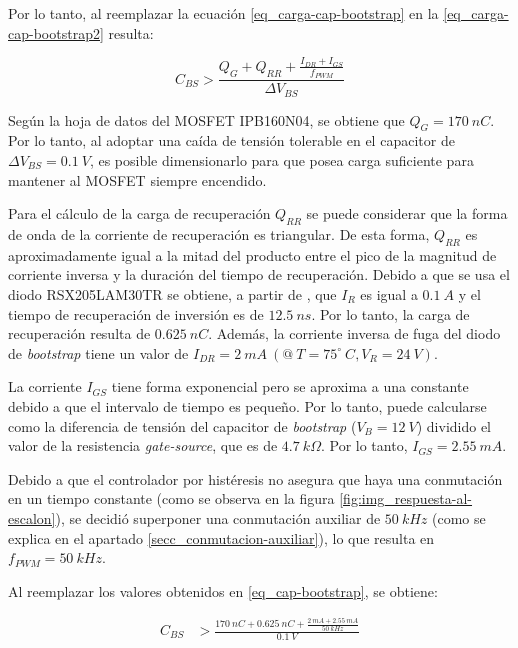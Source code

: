 \noindent Por lo tanto, al reemplazar la ecuación \ref{eq_carga-cap-bootstrap} en la \ref{eq_carga-cap-bootstrap2} resulta:


\begin{equation} \label{eq_cap-bootstrap}
	C_{BS} > \frac{Q_G+Q_{RR} + \frac{I_{DR}+I_{GS}}{f_{PWM}}}{\Delta V_{BS}}
\end{equation}

\noindent Según la hoja de datos \cite{IPB160N04} del MOSFET IPB160N04, se obtiene que $Q_G= 170\:nC$. Por lo tanto, al adoptar una caída de tensión tolerable en el capacitor de $\Delta V_{BS} = 0.1\:V$, es posible dimensionarlo para que posea carga suficiente para mantener al MOSFET siempre encendido.

\noindent Para el cálculo de la carga de recuperación $Q_{RR}$ se puede considerar que la forma de onda de la corriente de recuperación es triangular. De esta forma,  $Q_{RR}$ es aproximadamente igual a la mitad del producto entre el pico de la magnitud de corriente inversa y la duración del tiempo de recuperación.  Debido a que se usa el diodo RSX205LAM30TR se obtiene, a partir de \cite{RSX205LAM30}, que  $I_R$ es igual a $0.1\:A$  y  el tiempo de recuperación de inversión es de $12.5\:ns$. Por lo tanto, la carga de recuperación resulta de $0.625\:nC$. Además, la corriente inversa de fuga del diodo de \textsl{bootstrap} tiene un valor de $I_{DR} =2 \:mA\:(@\: T=75^{\circ}\:C, V_R= 24\:V)$.

\noindent La corriente $I_{GS}$ tiene forma exponencial pero se aproxima a una constante debido a que el intervalo de tiempo es pequeño. Por lo tanto, puede calcularse como la diferencia de tensión del capacitor de \textsl{bootstrap} ($V_B=12\:V$) dividido el valor de la resistencia \textsl{gate-source}, que es de $4.7\:k\Omega$. Por lo tanto, $I_{GS}=2.55 \:mA$. 

\noindent Debido a que el controlador por histéresis no asegura que haya una conmutación en un tiempo constante (como se observa en la figura \ref{fig:img_respuesta-al-escalon}), se decidió superponer una conmutación auxiliar de $50\:kHz$ (como se explica en el apartado \ref{secc_conmutacion-auxiliar}), lo que resulta en $f_{PWM}=50 \:kHz$. 

\noindent Al reemplazar los valores obtenidos en \ref{eq_cap-bootstrap}, se obtiene:

\begin{equation} 
	\begin{aligned}
		C_{BS} &> \frac{170 \:nC + 0.625\:nC + \frac{2 \:mA + 2.55 \:mA}{50 \:kHz}}{0.1 \:V}\\
	\end{aligned}
\end{equation}

